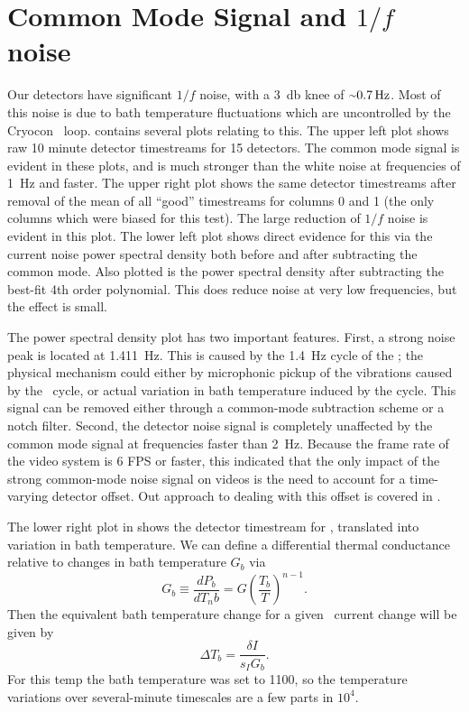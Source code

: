 \section{Common Mode Signal and $1/f$ noise}


Our detectors have significant $1/f$ noise, with a \SI{3}{\decibel} knee of $\abt\SI{0.7}{\hertz}$.
Most of this noise is due to bath temperature fluctuations which are uncontrolled by the Cryocon \PID\ loop.
 contains several plots relating to this.
The upper left plot shows raw 10 minute detector timestreams for 15 detectors.
The common mode signal is evident in these plots, and is much stronger than the white noise at frequencies of \SI{1}{\Hz} and faster.
The upper right plot shows the same detector timestreams after removal of the mean of all ``good'' timestreams for columns 0 and 1 (the only columns which were biased for this test).
The large reduction of $1/f$ noise is evident in this plot.
The lower left plot shows direct evidence for this via the current noise power spectral density both before and after subtracting the common mode.
Also plotted is the power spectral density after subtracting the best-fit 4th order polynomial.
This does reduce noise at very low frequencies, but the effect is small.

The power spectral density plot has two important features.
First, a strong noise peak is located at \SI{1.411}{\Hz}.
This is caused by the \abt \SI{1.4}{\Hz} cycle of the \PTC; the physical mechanism could either by microphonic pickup of the vibrations caused by the \PTC\ cycle, or actual variation in bath temperature induced by the cycle.
This signal can be removed either through a common-mode subtraction scheme or a notch filter.
Second, the detector noise signal is completely unaffected by the common mode signal at frequencies faster than \SI{2}{\Hz}.
Because the frame rate of the video system is 6 FPS or faster, this indicated that the only impact of the strong common-mode noise signal on videos is the need to account for a time-varying detector offset.
Out approach to dealing with this offset is covered in .

The lower right plot in  shows the detector timestream for , translated into variation in bath temperature.
We can define a differential thermal conductance relative to changes in bath temperature $G_b$ via
\begin{equation}
  G_b \equiv \frac{dP_b}{d T_nb} = G \left( \frac{T_b}{T} \right)^{n-1}.
\end{equation}
Then the equivalent bath temperature change for a given \TES\ current change will be given by
\begin{equation}
  \Delta T_b = \frac{\delta I}{s_I G_b}.
\end{equation}
For this temp the bath temperature was set to \SI{1100}{\mK}, so the temperature variations over several-minute timescales are a few parts in $10^{4}$.


